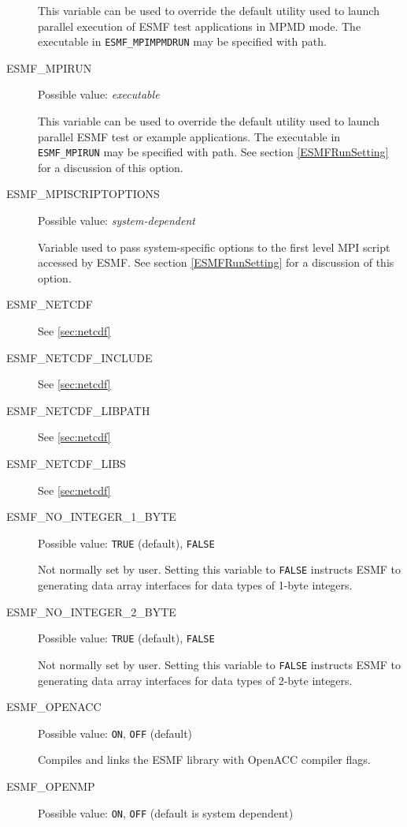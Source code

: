 \begin{description}
This variable can be used to override the default utility used to launch
parallel execution of ESMF test applications in MPMD mode. The executable in
{\tt ESMF\_MPIMPMDRUN} may be specified with path.

\item[ESMF\_MPIRUN]
Possible value: {\em executable}

This variable can be used to override the default utility used to launch
parallel ESMF test or example applications. The executable in {\tt ESMF\_MPIRUN}
may be specified with path.
See section \ref{ESMFRunSetting} for a discussion of this option.

\item[ESMF\_MPISCRIPTOPTIONS]
Possible value: {\em system-dependent}

Variable used to pass system-specific options to the first level MPI script
accessed by ESMF.
See section \ref{ESMFRunSetting} for a discussion of this option.

\item[ESMF\_NETCDF]
See \ref{sec:netcdf}

\item[ESMF\_NETCDF\_INCLUDE]
See \ref{sec:netcdf}

\item[ESMF\_NETCDF\_LIBPATH]
See \ref{sec:netcdf}

\item[ESMF\_NETCDF\_LIBS]
See \ref{sec:netcdf}

\item[ESMF\_NO\_INTEGER\_1\_BYTE]
Possible value: {\tt TRUE} (default), {\tt FALSE}

Not normally set by user. Setting this variable to {\tt FALSE} instructs
ESMF to generating data array interfaces for data types of 1-byte integers.

\item[ESMF\_NO\_INTEGER\_2\_BYTE]
Possible value: {\tt TRUE} (default), {\tt FALSE}

Not normally set by user. Setting this variable to {\tt FALSE} instructs
ESMF to generating data array interfaces for data types of 2-byte integers.

\item[ESMF\_OPENACC]
Possible value: {\tt ON}, {\tt OFF} (default)

Compiles and links the ESMF library with OpenACC compiler flags.

\item[ESMF\_OPENMP]
Possible value: {\tt ON}, {\tt OFF} (default is system dependent)


\end{description}
